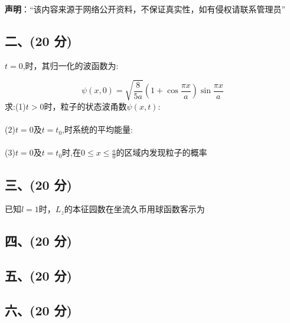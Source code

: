 
\textbf{声明}：“该内容来源于网络公开资料，不保证真实性，如有侵权请联系管理员”

\subsection{二、(20 分)}
 \( t = 0 \),时，其归一化的波函数为:

\[
\psi(x,0) = \sqrt{\frac{8}{5a}} (1 + \cos\frac{\pi x}{a}) \sin\frac{\pi x}{a}~
\]
求:(1)$t>0$时，粒子的状态波甬数$\psi(x,t)$:\\\\
(2)$t=0$及$t=t_0$,时系统的平均能量:\\\\
(3)$t=0$及$t=t_0$时,在$0\leq x\leq \frac{a}{0}$的区域内发现粒子的概率
\subsection{三、(20 分)}
已知$l=1$时，$L_z$的本征园数在坐流久币用球函数客示为
\subsection{四、(20 分)}

\subsection{五、(20 分)}

\subsection{六、(20 分)}